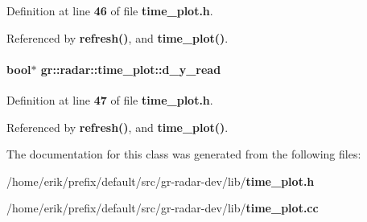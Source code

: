 Definition at line {\bf 46} of file {\bf time\+\_\+plot.\+h}.



Referenced by {\bf refresh()}, and {\bf time\+\_\+plot()}.

\paragraph[{d\+\_\+y\+\_\+read}]{\setlength{\rightskip}{0pt plus 5cm}bool$\ast$ gr\+::radar\+::time\+\_\+plot\+::d\+\_\+y\+\_\+read\hspace{0.3cm}{\ttfamily [private]}}\label{classgr_1_1radar_1_1time__plot_affd4e3acc2d5100108d23175d2e20578}


Definition at line {\bf 47} of file {\bf time\+\_\+plot.\+h}.



Referenced by {\bf refresh()}, and {\bf time\+\_\+plot()}.



The documentation for this class was generated from the following files\+:\begin{DoxyCompactItemize}
\item 
/home/erik/prefix/default/src/gr-\/radar-\/dev/lib/{\bf time\+\_\+plot.\+h}\item 
/home/erik/prefix/default/src/gr-\/radar-\/dev/lib/{\bf time\+\_\+plot.\+cc}\end{DoxyCompactItemize}
